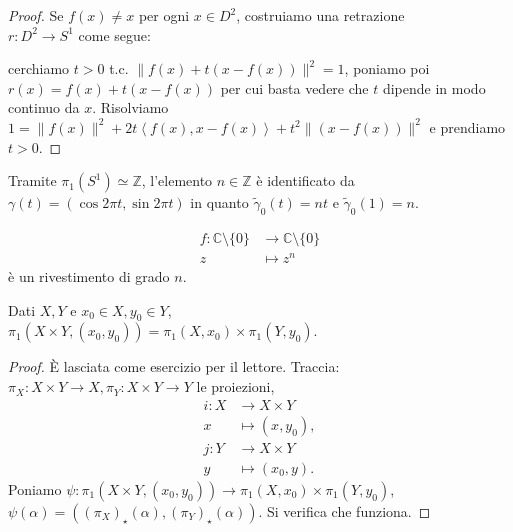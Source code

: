 \begin{proof}
  Se $f(x)\not=x$ per ogni $x \in D^2$, costruiamo una retrazione \\
  $r:D^2 \longrightarrow S^1$ come segue:
  \begin{center}
\end{center}
cerchiamo $t>0$ t.c. $\|f(x)+t(x-f(x))\|^2=1$, poniamo poi $r(x)=f(x)+t(x-f(x))$ per cui basta vedere che $t$ dipende in modo continuo da $x$. Risolviamo $1=\|f(x)\|^2+2t\left \langle f(x), x-f(x) \right \rangle+t^2\|(x-f(x))\|^2$ e prendiamo $t>0$.
\end{proof}

\begin{oss}
  Tramite $\pi_1(S^1) \simeq \mathbb{Z}$, l'elemento $n \in \mathbb{Z}$ è identificato da $\gamma(t)=(\cos{2\pi t}, \sin{2\pi t})$ in quanto $\tilde{\gamma}_0(t)=nt$ e $\tilde{\gamma}_0(1)=n$.
\end{oss}

\begin{exc}
  \begin{align*}
    f:\mathbb{C} \setminus \{0\} &\longrightarrow \mathbb{C} \setminus \{0\} \\
    z &\longmapsto z^n
  \end{align*}
  è un rivestimento di grado $n$.
\end{exc}

\begin{thm}
  Dati $X, Y$ e $x_0 \in X, y_0 \in Y$, \\ $\pi_1(X \times Y, (x_0, y_0))=\pi_1(X, x_0) \times \pi_1(Y, y_0)$.
\end{thm}

\begin{proof}
  È lasciata come esercizio per il lettore. Traccia: $\pi_X:X \times Y \longrightarrow X, \pi_Y:X \times Y \longrightarrow Y$ le proiezioni,
  \begin{align*}
    i:X &\longrightarrow X \times Y \\
    x &\longmapsto (x, y_0), \\
    j:Y &\longrightarrow X \times Y \\
    y &\longmapsto (x_0, y).
  \end{align*}
  Poniamo $\psi:\pi_1(X \times Y, (x_0, y_0)) \longrightarrow \pi_1(X, x_0) \times \pi_1(Y, y_0)$, $\psi(\alpha)=((\pi_X)_{\star}(\alpha), (\pi_Y)_{\star}(\alpha))$. Si verifica che funziona.
\end{proof}

